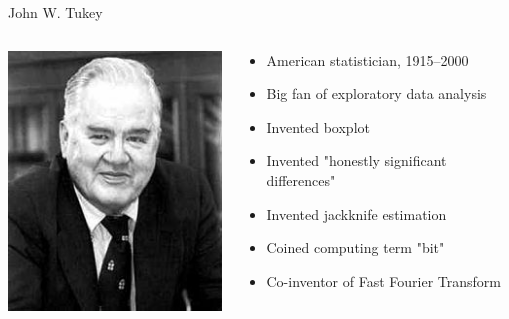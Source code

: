 \documentclass[ignorenonframetext,]{beamer}
\begin{document}
\begin{frame}{John W. Tukey}
\protect\hypertarget{john-w.-tukey}{}

\begin{columns}
    \begin{column}{0.4\textwidth}
      \includegraphics[width=\textwidth]{John_Tukey}
    \end{column}
    \begin{column}{0.6\textwidth}
      \begin{itemize}
      \item American statistician, 1915--2000
      \item Big fan of exploratory data analysis
      \item Invented boxplot
      \item Invented "honestly significant differences"
      \item Invented jackknife estimation
      \item Coined computing term "bit"
      \item Co-inventor of Fast Fourier Transform
      \end{itemize}
    \end{column}
  \end{columns}

\end{frame}
\end{document}

